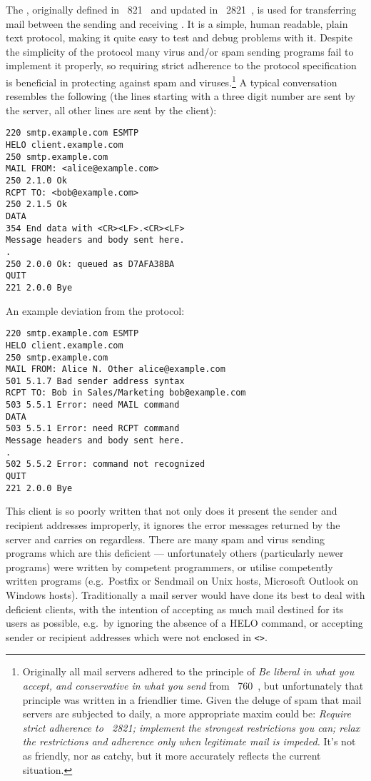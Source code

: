 The \SMTPlong{}, originally defined in \RFC{}~821~\cite{RFC821} and updated
in \RFC{}~2821~\cite{RFC2821}, is used for transferring mail between the
sending and receiving \MTA{}\@.  It is a simple, human readable, plain text
protocol, making it quite easy to test and debug problems with it.  Despite
the simplicity of the protocol many virus and/or spam sending programs fail
to implement it properly, so requiring strict adherence to the protocol
specification is beneficial in protecting against spam and
viruses.\footnote{\label{footnote:rfc760}Originally all mail servers
adhered to the principle of \textit{Be liberal in what you accept, and
conservative in what you send\/} from \RFC{}~760~\cite{rfc760}, but
unfortunately that principle was written in a friendlier time.  Given the
deluge of spam that mail servers are subjected to daily, a more appropriate
maxim could be: \textit{Require strict adherence to \RFC{}~2821; implement
the strongest restrictions you can; relax the restrictions and adherence
only when legitimate mail is impeded.\/}  It's not as friendly, nor as
catchy, but it more accurately reflects the current situation.} A typical
\SMTP{} conversation resembles the following (the lines starting with a
three digit number are sent by the server, all other lines are sent by the
client):

\begin{verbatim}
220 smtp.example.com ESMTP
HELO client.example.com
250 smtp.example.com
MAIL FROM: <alice@example.com>
250 2.1.0 Ok
RCPT TO: <bob@example.com>
250 2.1.5 Ok
DATA
354 End data with <CR><LF>.<CR><LF>
Message headers and body sent here.
.
250 2.0.0 Ok: queued as D7AFA38BA
QUIT
221 2.0.0 Bye
\end{verbatim}

An example deviation from the protocol:

\begin{verbatim}
220 smtp.example.com ESMTP
HELO client.example.com
250 smtp.example.com
MAIL FROM: Alice N. Other alice@example.com
501 5.1.7 Bad sender address syntax
RCPT TO: Bob in Sales/Marketing bob@example.com
503 5.5.1 Error: need MAIL command
DATA
503 5.5.1 Error: need RCPT command
Message headers and body sent here.
.
502 5.5.2 Error: command not recognized
QUIT
221 2.0.0 Bye
\end{verbatim}

This client is so poorly written that not only does it present the sender
and recipient addresses improperly, it ignores the error messages returned
by the server and carries on regardless.  There are many spam and virus
sending programs which are this deficient --- unfortunately others
(particularly newer programs) were written by competent programmers, or
utilise competently written programs (e.g.\ Postfix or Sendmail on Unix
hosts, Microsoft Outlook on Windows hosts).  Traditionally a mail server
would have done its best to deal with deficient clients, with the intention
of accepting as much mail destined for its users as
possible, e.g.\ by ignoring the absence of a HELO
command, or accepting sender or recipient addresses which were not enclosed
in \texttt{<>}.  

